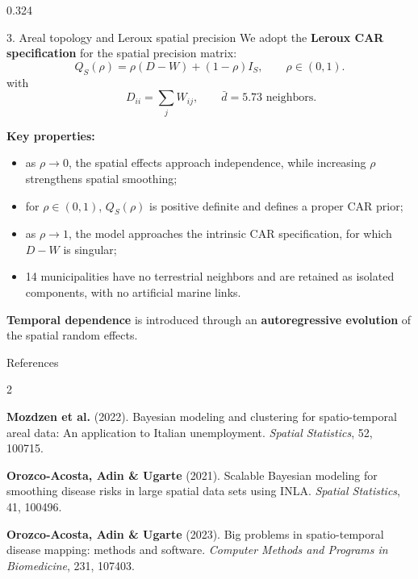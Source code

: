 \documentclass[final]{beamer}
\newcommand{\smallgap}{\vspace{0.25cm}}
\begin{document}
\begin{frame}[t]
\begin{columns}[t,totalwidth=\textwidth]
\begin{column}{0.324\textwidth}
\begin{block}{3. Areal topology and Leroux spatial precision}
\noindent We adopt the \textbf{Leroux CAR specification} for the spatial precision matrix:
\[
Q_S(\rho)=\rho(D-W)+(1-\rho)I_S,
\qquad \rho\in(0,1).
\] 
with 
\[
\qquad D_{ii} = \sum_j W_{ij}, \qquad \bar{d} = 5.73 \text{ neighbors}.
\]

\textbf{Key properties:}
\begin{itemize}

 \item as $\rho\rightarrow0$, the spatial effects approach independence,
  while increasing $\rho$ strengthens spatial smoothing;

  \item for $\rho\in(0,1)$, $Q_S(\rho)$ is positive definite and defines a
  proper CAR prior;

  \item as $\rho\rightarrow1$, the model approaches the intrinsic CAR
  specification, for which $D-W$ is singular;

  \item 14 municipalities have no terrestrial neighbors and are retained as
  isolated components, with no artificial marine links.

\end{itemize}

\textbf{Temporal dependence} is introduced through an \textbf{autoregressive evolution} of the spatial random effects.

\smallgap
\end{block}

\begin{block}{References}

\scriptsize
\justifying
\begin{multicols}{2}

\textbf{Mozdzen et al.} (2022).
Bayesian modeling and clustering for spatio-temporal areal data:
An application to Italian unemployment.
\textit{Spatial Statistics}, 52, 100715.

\textbf{Orozco-Acosta, Adin \& Ugarte} (2021).
Scalable Bayesian modeling for smoothing disease risks in large spatial
data sets using INLA.
\textit{Spatial Statistics}, 41, 100496.

\textbf{Orozco-Acosta, Adin \& Ugarte} (2023).
Big problems in spatio-temporal disease mapping: methods and software.
\textit{Computer Methods and Programs in Biomedicine}, 231, 107403.


\end{multicols}
\end{block}
\end{column}
\end{columns}
\end{frame}
\end{document}
